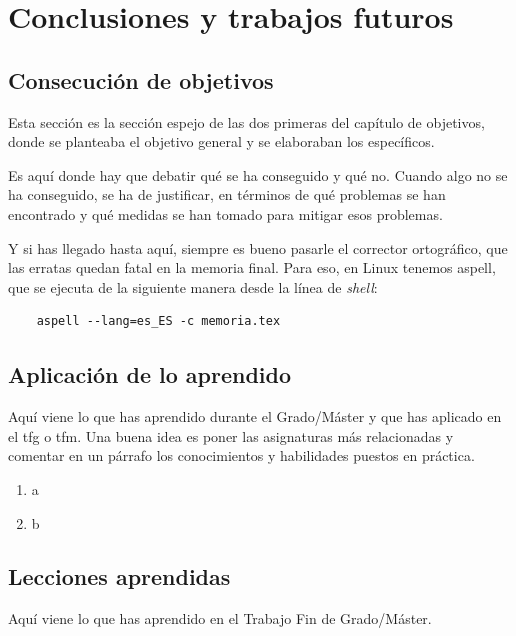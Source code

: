 \chapter{Conclusiones y trabajos futuros}
\label{chap:conclusiones}


\section{Consecución de objetivos}
\label{sec:consecucion-objetivos}

Esta sección es la sección espejo de las dos primeras del capítulo de objetivos, donde se planteaba el objetivo general y se elaboraban los específicos.

Es aquí donde hay que debatir qué se ha conseguido y qué no. 
Cuando algo no se ha conseguido, se ha de justificar, en términos de qué problemas se han encontrado y qué medidas se han tomado para mitigar esos problemas.

Y si has llegado hasta aquí, siempre es bueno pasarle el corrector ortográfico, que las erratas quedan fatal en la memoria final.
Para eso, en Linux tenemos aspell, que se ejecuta de la siguiente manera desde la línea de \emph{shell}:

\begin{verbatim}
    aspell --lang=es_ES -c memoria.tex
\end{verbatim}

\section{Aplicación de lo aprendido}
\label{sec:aplicacion}

Aquí viene lo que has aprendido durante el Grado/Máster y que has aplicado en el \acrshort{tfg} o \acrshort{tfm}. Una buena idea es poner las asignaturas más relacionadas y comentar en un párrafo los conocimientos y habilidades puestos en práctica.

\begin{enumerate}
    \item a
    \item b
\end{enumerate}


\section{Lecciones aprendidas}
\label{sec:lecciones_aprendidas}

Aquí viene lo que has aprendido en el Trabajo Fin de Grado/Máster.

